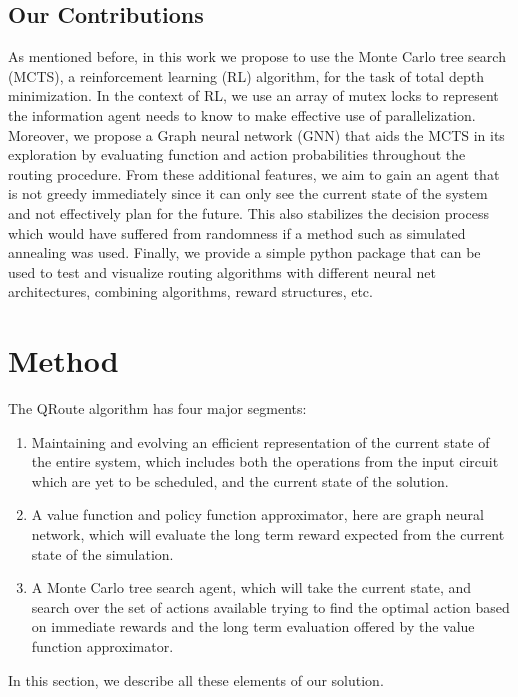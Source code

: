 \documentclass[%
 reprint,
 longbibliography,
 amsmath,amssymb,
 aps,
]{revtex4-2}
\begin{document}
\subsection{\label{sec:intro-contribution}Our Contributions}

As mentioned before, in this work we propose to use the Monte Carlo tree search (MCTS), a reinforcement learning (RL) algorithm, for the task of total depth minimization. In the context of RL, we use an array of mutex locks to represent the information agent needs to know to make effective use of parallelization. Moreover, we propose a Graph neural network (GNN) that aids the MCTS in its exploration by evaluating function and action probabilities throughout the routing procedure. From these additional features, we aim to gain an agent that is not greedy immediately since it can only see the current state of the system and not effectively plan for the future. This also stabilizes the decision process which would have suffered from randomness if a method such as simulated annealing was used. Finally, we provide a simple python package that can be used to test and visualize routing algorithms with different neural net architectures, combining algorithms, reward structures, etc.

\section{\label{sec:method}Method}

The QRoute algorithm has four major segments:
\begin{enumerate}
    \item Maintaining and evolving an efficient representation of the current state of the entire system, which includes both the operations from the input circuit which are yet to be scheduled, and the current state of the solution.
    \item A value function and policy function approximator, here are graph neural network, which will evaluate the long term reward expected from the current state of the simulation.
    \item A Monte Carlo tree search agent, which will take the current state, and search over the set of actions available trying to find the optimal action based on immediate rewards and the long term evaluation offered by the value function approximator.
\end{enumerate}

In this section, we describe all these elements of our solution. \citep{codebase}
\end{document}
